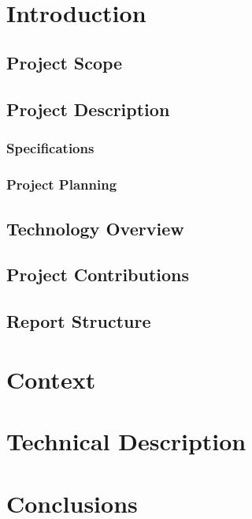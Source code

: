 \documentclass[12pt,a4paper,oneside]{book}
\begin{document}
\pagestyle{plain}

\frontmatter

\pagestyle{fancy}

\titlepage\ \endtitlepage




\tableofcontents
\listoffigures
\listoftables



\mainmatter

\chapter{Introduction}
	\section{Project Scope}
	\section{Project Description}
		\subsection{Specifications}
		\subsection{Project Planning}
	\section{Technology Overview}
	\section{Project Contributions}
	\section{Report Structure}

\chapter{Context}

\chapter{Technical Description}

\chapter{Conclusions}
\end{document}
